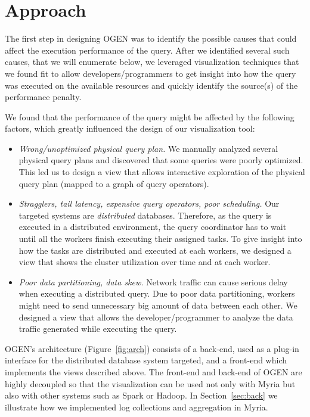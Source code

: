 \documentclass{chi2009}
\newcommand*{\system}{OGEN\xspace}
\begin{document}
\section{Approach}
\label{sec:approach}


The first step in designing \system was to identify the possible causes that
could affect the execution performance of the query. After we identified
several such causes, that we will enumerate below, we leveraged visualization
techniques that we found fit to allow developers/programmers to get insight
into how the query was executed on the available resources and quickly
identify the source(s) of the performance penalty.

We found that the performance of the query might be affected by the following
factors, which greatly influenced the design of our visualization tool:
\begin{itemize}
   \item \emph{Wrong/unoptimized physical query plan.} We manually analyzed
several physical query plans and discovered that some queries were poorly
optimized. This led us to design a view that allows interactive exploration of
the physical query plan (mapped to a graph of query operators).
   \item \emph{Stragglers, tail latency, expensive query operators, poor
scheduling.} Our targeted systems are \emph{distributed} databases. Therefore,
as the query is executed in a distributed environment, the query coordinator
has to wait until all the workers finish executing their assigned tasks. To
give insight into how the tasks are distributed and executed at each workers,
we designed a view that shows the cluster utilization over time and at each
worker.
   \item \emph{Poor data partitioning, data skew.} Network traffic can cause
serious delay when executing a distributed query. Due to poor data
partitioning, workers might need to send unnecessary big amount of data between
each other. We designed a view that allows the developer/programmer to analyze
the data traffic generated while executing the query.
\end{itemize}


\system's architecture (Figure~\ref{fig:arch}) consists of a back-end,
used as a plug-in interface for the distributed database system targeted, and a
front-end which implements the views described above. The front-end and
back-end of \system are highly decoupled so that the visualization can be used not only with
Myria but also with other systems such as Spark or Hadoop. In
Section~\ref{sec:back} we illustrate how we implemented log collections and
aggregation in Myria.
\end{document}
